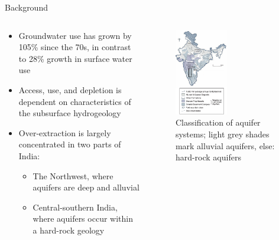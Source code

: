\documentclass[10pt]{beamer}
\begin{document}
\begin{frame}
	{Background}
	\begin{columns}
		\begin{column}{0.5\textwidth}
			\begin{itemize}
				\item Groundwater use has grown by 105\% since the 70s, in contrast to 28\% growth in surface water use
				\item Access, use, and depletion is dependent on characteristics of the subsurface hydrogeology
				\item Over-extraction is largely concentrated in two parts of India:
				      \begin{itemize}
					      \item The Northwest, where aquifers are deep and alluvial
					      \item Central-southern India, where aquifers occur within a hard-rock geology
				      \end{itemize}
			\end{itemize}
		\end{column}
		\begin{column}{0.5\textwidth}
			\centering
			\begin{figure}
				\centering
				\includegraphics[width=0.5\textwidth]{figure1_right.png}
				\caption{Classification of aquifer systems; light grey shades mark alluvial aquifers, else: hard-rock aquifers}
			\end{figure}
		\end{column}
	\end{columns}
\end{frame}
\end{document}
